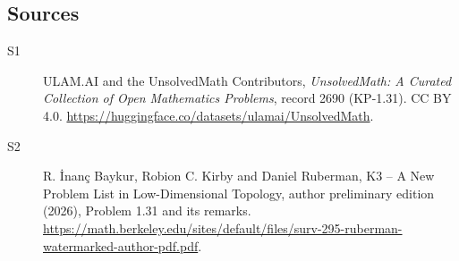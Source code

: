 \documentclass[11pt]{article}
\begin{document}
\subsection{Sources}
\begin{description}
\item[\hypertarget{source:2690:1}{S1}] ULAM.AI and the UnsolvedMath Contributors, \emph{UnsolvedMath: A Curated Collection of Open Mathematics Problems}, record 2690 (KP-1.31). CC BY 4.0. \url{https://huggingface.co/datasets/ulamai/UnsolvedMath}.
\item[\hypertarget{source:2690:2}{S2}] R. \.{I}nan\c{c} Baykur, Robion C. Kirby and Daniel Ruberman, K3 -- A New Problem List in Low-Dimensional Topology, author preliminary edition (2026), Problem 1.31 and its remarks. \url{https://math.berkeley.edu/sites/default/files/surv-295-ruberman-watermarked-author-pdf.pdf}.
\end{description}
\label{end:2690}
\end{document}
